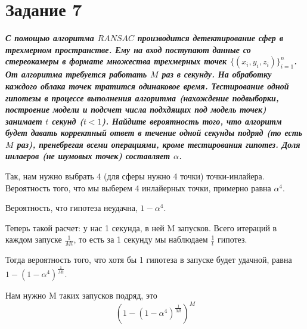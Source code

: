 \documentclass{article}
\begin{document}
\bigskip


\section*{\textbf{Задание 7}} \textbf{\textit{С помощью алгоритма $RANSAC$ производится детектирование сфер в трехмерном пространстве. Ему на вход поступают данные со стереокамеры в формате множества трехмерных точек $\{ (x_i, y_i, z_i) \}_{i=1}^n$. От алгоритма требуется работать $M$ раз в секунду. На обработку каждого облака точек тратится одинаковое время. Тестирование одной гипотезы в процессе выполнения алгоритма (нахождение подвыборки, построение модели и подсчет числа подхдящих под модель точек) занимает $t$ секунд ($t < 1$). Найдите вероятность того, что алгоритм будет давать корректный ответ в течение одной секунды подряд (то есть $M$ раз), пренебрегая всеми операциями, кроме тестирования гипотез. Доля инлаеров (не шумовых точек) составляет $\alpha$.}}

Так, нам нужно выбрать 4 (для сферы нужно 4 точки) точки-инлайера. Вероятность того, что мы выберем 4 инлайерных точки, примерно равна $\alpha ^4$. 

Вероятность, что гипотеза неудачна, $1 - \alpha^4$. 

Теперь такой расчет: у нас 1 секунда, в ней M запусков. Всего итераций в каждом запуске $\frac{1}{Mt}$, то есть за 1 секунду мы наблюдаем $\frac{1}{t}$ гипотез.

Тогда вероятность того, что хотя бы 1 гипотеза в запуске будет удачной, равна $1 - (1 - \alpha^4)^{\frac{1}{Mt}}$. 

Нам нужно M таких запусков подряд, это $$(1 - (1 - \alpha^4)^{\frac{1}{Mt}})^M$$






\bigskip
\end{document}
